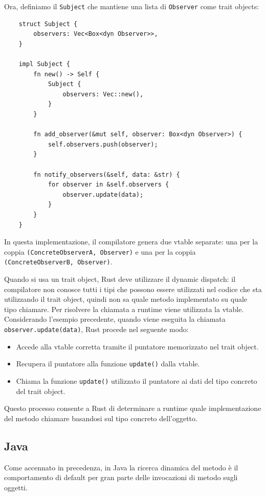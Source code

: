 Ora, definiamo il \texttt{Subject} che mantiene una lista di \texttt{Observer} come trait objects:
\begin{verbatim}
    struct Subject {
        observers: Vec<Box<dyn Observer>>,
    }

    impl Subject {
        fn new() -> Self {
            Subject {
                observers: Vec::new(),
            }
        }

        fn add_observer(&mut self, observer: Box<dyn Observer>) {
            self.observers.push(observer);
        }

        fn notify_observers(&self, data: &str) {
            for observer in &self.observers {
                observer.update(data);
            }
        }
    }
\end{verbatim}
In questa implementazione, il compilatore genera due vtable separate: una per la coppia \texttt{(ConcreteObserverA, Observer)} e una per la coppia \texttt{(ConcreteObserverB, Observer)}. 

Quando si usa un trait object, Rust deve utilizzare il dynamic dispatch: il compilatore non conosce tutti i tipi che possono essere utilizzati nel codice che sta utilizzando il trait object, quindi non sa quale metodo implementato su quale tipo chiamare. Per risolvere la chiamata a runtime viene utilizzata la vtable. Considerando l'esempio precedente, quando viene eseguita la chiamata \texttt{observer.update(data)}, Rust procede nel seguente modo:
\begin{itemize}
    \item Accede alla vtable corretta tramite il puntatore memorizzato nel trait object.
    \item Recupera il puntatore alla funzione \texttt{update()} dalla vtable.
    \item Chiama la funzione \texttt{update()} utilizzato il puntatore ai dati del tipo concreto del trait object.
\end{itemize}
Questo processo consente a Rust di determinare a runtime quale implementazione del metodo chiamare basandosi sul tipo concreto dell'oggetto. 
\subsection{Java}
Come accennato in precedenza, in Java la ricerca dinamica del metodo è il comportamento di default per gran parte delle invocazioni di metodo sugli oggetti. 
